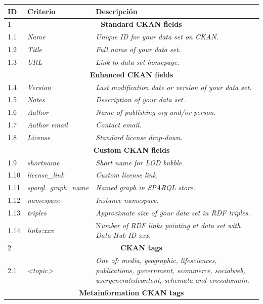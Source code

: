 \begin{longtable}[c]{|l|p{5cm}|p{10cm}|} 
\hline
  \textbf{ID} & \textbf{Criterio} &  \textbf{Descripción} \\\hline
\endhead
  1&\multicolumn{2}{|c|}{\textbf{Standard \gls{CKAN} fields}}  \\ \hline
  1.1&  \textit{Name} & \textit{Unique ID for your data set on CKAN. }\\ \hline
  1.2 &  \textit{Title} & \textit{Full name of your data set. }\\ \hline
  1.3 &  \textit{URL} & \textit{Link to data set homepage.} \\ \hline
  \multicolumn{3}{|c|}{\textbf{Enhanced CKAN fields}}  \\ \hline
   1.4&  \textit{Version} & \textit{Last modification date or version of your data set.} \\ \hline
   1.5&  \textit{Notes} & \textit{Description of your data set.} \\ \hline
   1.6&  \textit{Author} & \textit{Name of publishing org and/or person. }\\ \hline
   1.7&  \textit{Author email} & \textit{Contact email.} \\ \hline
   1.8&  \textit{License} & \textit{Standard license drop-down}. \\ \hline
   \multicolumn{3}{|c|}{\textbf{Custom CKAN fields}}  \\ \hline
   1.9&  \textit{shortname} & \textit{Short name for LOD bubble.} \\ \hline
   1.10&  \textit{license\_link} & \textit{Custom license link. }\\ \hline
   1.11&  \textit{sparql\_graph\_name} & \textit{Named graph in SPARQL store.} \\ \hline
   1.12&  \textit{namespace} & \textit{Instance namespace.} \\ \hline
   1.13&  \textit{triples} & \textit{Approximate size of your data set in RDF triples.} \\ \hline
   1.14&  \textit{links:xxx} & N\textit{umber of \gls{RDF} links pointing at data set with Data Hub ID xxx.} \\ \hline
  2&\multicolumn{2}{|c|}{\textbf{CKAN tags}}  \\ \hline
  2.1&  \textit{<topic>} & \textit{One of: media, geographic, lifesciences, publications, government, ecommerce, socialweb, usergeneratedcontent, schemata and crossdomain.} \\ \hline
  \multicolumn{3}{|c|}{\textbf{Metainformation CKAN tags}}  \\ \hline  

\end{longtable}
